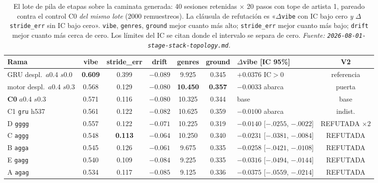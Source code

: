 \documentclass[11pt]{article}
\newcommand{\best}[1]{\textbf{#1}}
\begin{document}
\begin{table}[ht]
  \centering
  \caption{El lote de pila de etapas sobre la caminata generada: \num{40} sesiones
  retenidas $\times$ \num{20} pasos con tope de artista 1, pareado contra el
  control C0 \emph{del mismo lote} (\num{2000} remuestreos). La cláusula de
  refutación es «$\Delta$\texttt{vibe} con IC bajo cero \emph{y}
  $\Delta$\texttt{stride\_err} sin IC bajo cero». \texttt{vibe},
  \texttt{genres}, \texttt{ground} mejor cuanto más alto; \texttt{stride\_err}
  mejor cuanto más bajo; \texttt{drift} mejor cuanto más cerca de cero. Los límites
  del IC se citan donde el intervalo se separa de cero.
  \emph{Fuente: \texttt{2026-08-01-stage-stack-topology.md}.}}
  \label{tab:nexttrack-stagestack-s2}
  {\footnotesize\setlength{\tabcolsep}{2.2pt}\begin{tabular}{lccccclc}
    \toprule
    Rama & vibe & stride\_err & drift & genres & ground & $\Delta$vibe [IC 95\%] & V2 \\
    \midrule
    GRU despl.\ $a$0.4 $s$0.0 & \best{0.609} & 0.399 & $-0.089$ & 9.925 & 0.345 & $+0.0376$ IC$>$0 & referencia \\
    motor despl.\ $a$0.4 $s$0.3 & 0.568 & 0.129 & $-0.080$ & \best{10.450} & \best{0.357} & $-0.0033$ abarca & puerta \\
    \textbf{C0} $a$0.4 $s$0.3 & 0.571 & 0.116 & $-0.080$ & 10.325 & 0.344 & base & base \\
    C1 \texttt{gru} h537 & 0.561 & 0.122 & $-0.082$ & 10.625 & 0.359 & $-0.0100$ abarca & indist. \\
    D \texttt{gggg} & 0.557 & 0.122 & $-0.071$ & 10.225 & 0.319 & $-0.0140$ [$-.0255$, $-.0022$] & REFUTADA $\times2$ \\
    C \texttt{aggg} & 0.548 & \best{0.113} & $-0.064$ & 10.250 & 0.340 & $-0.0231$ [$-.0381$, $-.0084$] & REFUTADA \\
    B \texttt{agga} & 0.545 & 0.126 & \best{$-0.061$} & 9.675 & 0.335 & $-0.0258$ [$-.0421$, $-.0108$] & REFUTADA \\
    E \texttt{gagg} & 0.540 & 0.109 & $-0.084$ & 9.225 & 0.335 & $-0.0316$ [$-.0494$, $-.0144$] & REFUTADA \\
    A \texttt{agag} & 0.534 & 0.117 & $-0.085$ & 9.125 & 0.336 & $-0.0375$ [$-.0559$, $-.0214$] & REFUTADA \\
    \bottomrule
  \end{tabular}}
\end{table}
\end{document}

